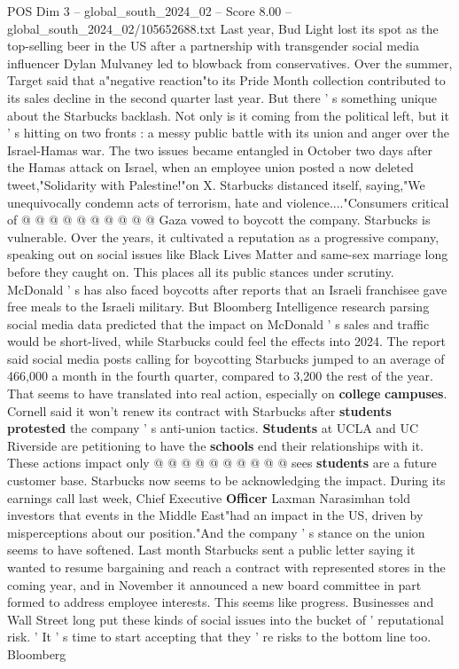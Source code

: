 \begin{textsample}{POS Dim 3 – global\_south\_2024\_02 – Score 8.00 – global\_south\_2024\_02/105652688.txt}
Last year, Bud Light lost its spot as the top-selling beer in the US after a partnership with transgender social media influencer Dylan Mulvaney led to blowback from conservatives.
Over the summer, Target said that a"negative reaction"to its Pride Month collection contributed to its sales decline in the second quarter last year.
But there ' s something unique about the Starbucks backlash.
Not only is it coming from the political left, but it ' s hitting on two fronts : a messy public battle with its union and anger over the Israel-Hamas war.
The two issues became entangled in October two days after the Hamas attack on Israel, when an employee union posted a now deleted tweet,"Solidarity with Palestine!"on X.
Starbucks distanced itself, saying,"We unequivocally condemn acts of terrorism, hate and violence...."Consumers critical of @ @ @ @ @ @ @ @ @ @ Gaza vowed to boycott the company.
Starbucks is vulnerable.
Over the years, it cultivated a reputation as a progressive company, speaking out on social issues like Black Lives Matter and same-sex marriage long before they caught on.
This places all its public stances under scrutiny.
McDonald ' s has also faced boycotts after reports that an Israeli franchisee gave free meals to the Israeli military.
But Bloomberg Intelligence research parsing social media data predicted that the impact on McDonald ' s sales and traffic would be short-lived, while Starbucks could feel the effects into 2024.
The report said social media posts calling for boycotting Starbucks jumped to an average of 466,000 a month in the fourth quarter, compared to 3,200 the rest of the year.
That seems to have translated into real action, especially on \textbf{college} \textbf{campuses}.
Cornell said it won't renew its contract with Starbucks after \textbf{students} \textbf{protested} the company ' s anti-union tactics. \textbf{Students} at UCLA and UC Riverside are petitioning to have the \textbf{schools} end their relationships with it.
These actions impact only @ @ @ @ @ @ @ @ @ @ sees \textbf{students} are a future customer base.
Starbucks now seems to be acknowledging the impact.
During its earnings call last week, Chief Executive \textbf{Officer} Laxman Narasimhan told investors that events in the Middle East"had an impact in the US, driven by misperceptions about our position."And the company ' s stance on the union seems to have softened.
Last month Starbucks sent a public letter saying it wanted to resume bargaining and reach a contract with represented stores in the coming year, and in November it announced a new board committee in part formed to address employee interests.
This seems like progress.
Businesses and Wall Street long put these kinds of social issues into the bucket of ' reputational risk. ' It ' s time to start accepting that they ' re risks to the bottom line too.
Bloomberg

\end{textsample}
